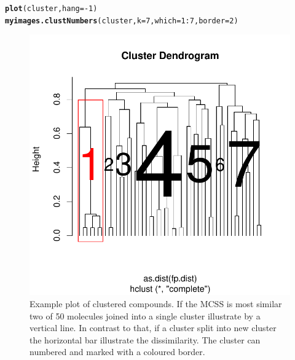 \documentclass[12pt, a4paper]{scrartcl}\usepackage[]{graphicx}\usepackage[]{color}
\makeatletter
\def\maxwidth{ %
  \ifdim\Gin@nat@width>\linewidth
    \linewidth
  \else
    \Gin@nat@width
  \fi
}
\newcommand{\hlnum}[1]{\textcolor[rgb]{0.686,0.059,0.569}{#1}}%
\newcommand{\hlopt}[1]{\textcolor[rgb]{0,0,0}{#1}}%
\newcommand{\hlstd}[1]{\textcolor[rgb]{0.345,0.345,0.345}{#1}}%
\newcommand{\hlkwc}[1]{\textcolor[rgb]{0.333,0.667,0.333}{#1}}%
\newcommand{\hlkwd}[1]{\textcolor[rgb]{0.737,0.353,0.396}{\textbf{#1}}}%
\newenvironment{kframe}{%
 \def\at@end@of@kframe{}%
 \ifinner\ifhmode%
  \def\at@end@of@kframe{\end{minipage}}%
  \begin{minipage}{\columnwidth}%
 \fi\fi%
 \def\FrameCommand##1{\hskip\@totalleftmargin \hskip-\fboxsep
 \colorbox{shadecolor}{##1}\hskip-\fboxsep
     \hskip-\linewidth \hskip-\@totalleftmargin \hskip\columnwidth}%
 \MakeFramed {\advance\hsize-\width
   \@totalleftmargin\z@ \linewidth\hsize
   \@setminipage}}%
 {\par\unskip\endMakeFramed%
 \at@end@of@kframe}
\newenvironment{knitrout}{}{} %
\makeatother
\begin{document}
\newpage
\begin{knitrout}
\color{fgcolor}\begin{kframe}
\begin{alltt}
\hlkwd{plot}\hlstd{(cluster,} \hlkwc{hang}\hlstd{=}\hlopt{-}\hlnum{1}\hlstd{)}
\hlkwd{myimages.clustNumbers}\hlstd{(cluster,} \hlkwc{k}\hlstd{=}\hlnum{7}\hlstd{,} \hlkwc{which}\hlstd{=}\hlnum{1}\hlopt{:}\hlnum{7}\hlstd{,} \hlkwc{border}\hlstd{=}\hlnum{2}\hlstd{)}
\end{alltt}
\end{kframe}\begin{figure}[h!]


{\centering \includegraphics[width=\maxwidth]{figure/plotNumDendro} 

}

\caption[Example plot of clustered compounds]{Example plot of clustered compounds. If the MCSS is most similar two of 50 molecules joined into a single cluster illustrate by a vertical line. In contrast to that, if a cluster split into new cluster the horizontal bar illustrate the dissimilarity. The cluster can numbered and marked with a coloured border.\label{fig:plotNumDendro}}
\end{figure}


\end{knitrout}
\end{document}

